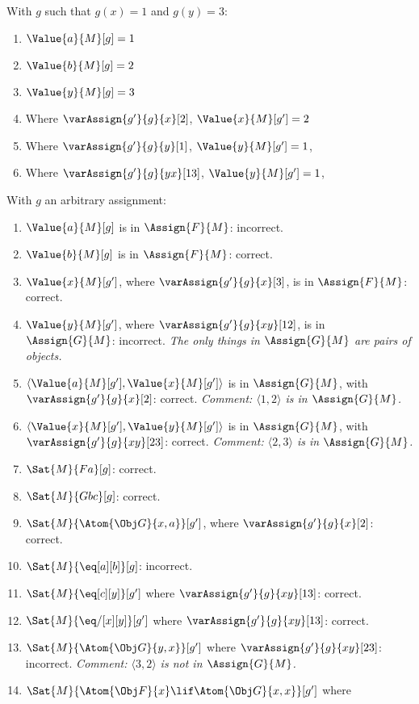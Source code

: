 \documentclass[../../../../include/open-logic-section]{subfiles}
\begin{document}
\begin{prob}
\begin{ans}
With $g$ such that $g(x)=1$ and $g(y)=3$:
\begin{enumerate}
	\item $\Value{a}{M}[g] = 1$
	\item $\Value{b}{M}[g] = 2$
	\item $\Value{y}{M}[g] = 3$
	\item Where $\varAssign{g'}{g}{x}[2]$, $\Value{x}{M}[g'] = 2$
	\item Where $\varAssign{g'}{g}{y}[1]$, $\Value{y}{M}[g'] = 1$, 
	\item Where $\varAssign{g'}{g}{yx}[13]$, $\Value{y}{M}[g'] = 1$, 
\end{enumerate}
With $g$ an arbitrary assignment:
\begin{enumerate}
	\item $\Value{a}{M}[g]$ is in $\Assign{F}{M}$: incorrect.
	\item $\Value{b}{M}[g]$ is in $\Assign{F}{M}$: correct.
	\item $\Value{x}{M}[g']$, where $\varAssign{g'}{g}{x}[3]$, is in $\Assign{F}{M}$: correct.
	\item $\Value{y}{M}[g']$, where $\varAssign{g'}{g}{xy}[12]$, is in $\Assign{G}{M}$: incorrect. \emph{The only things in $\Assign{G}{M}$ are pairs of objects.}
	\item $\langle\Value{a}{M}[g'], \Value{x}{M}[g']\rangle$ is in $\Assign{G}{M}$, with $\varAssign{g'}{g}{x}[2]$: correct. \emph{Comment: $\langle 1,2\rangle$ is in $\Assign{G}{M}$.}
	\item $\langle\Value{x}{M}[g'], \Value{y}{M}[g']\rangle$ is in $\Assign{G}{M}$, with $\varAssign{g'}{g}{xy}[23]$: correct. \emph{Comment: $\langle 2,3\rangle$ is in $\Assign{G}{M}$.}
	\item $\Sat{M}{Fa}[g]$: correct.
	\item $\Sat{M}{Gbc}[g]$: correct.
	\item $\Sat{M}{\Atom{\Obj G}{x,a}}[g']$, where $\varAssign{g'}{g}{x}[2]$: correct.
	\item $\Sat{M}{\eq[a][b]}[g]$: incorrect.
	\item $\Sat{M}{\eq[c][y]}[g']$ where $\varAssign{g'}{g}{xy}[13]$: correct.
	\item $\Sat{M}{\eq/[x][y]}[g']$ where $\varAssign{g'}{g}{xy}[13]$: correct.
	\item $\Sat{M}{\Atom{\Obj G}{y,x}}[g']$ where $\varAssign{g'}{g}{xy}[23]$: 
	incorrect. \emph{Comment: $\langle 3,2\rangle$ is not in $\Assign{G}{M}$.}
	\item $\Sat{M}{\Atom{\Obj F}{x}\lif \Atom{\Obj G}{x,x}}[g']$ where 

\end{enumerate}
\end{ans}
\end{prob}
\end{document}
